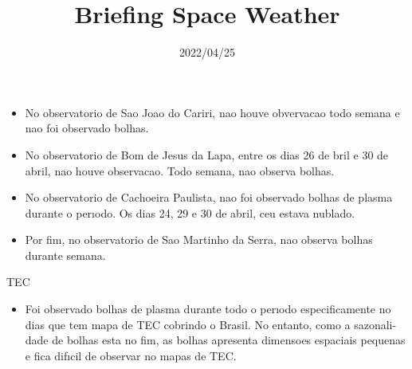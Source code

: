 \documentclass[11pt, oneside]{article}
\title{Briefing Space Weather}
\date{2022/04/25}
\begin{document}
\maketitle 

 \begin{itemize} 
 \item  No observatorio de Sao Joao do Cariri, nao houve obvervacao todo semana e nao foi observado bolhas. 
\item  No observatorio de Bom de Jesus da Lapa, entre os dias 26 de bril e 30 de abril, nao houve observacao. Todo semana, nao observa bolhas. 
\item  No observatorio de Cachoeira Paulista, nao foi observado bolhas de plasma durante o perıodo. Os dias 24, 29 e 30 de abril, ceu estava nublado. 
\item  Por fim, no observatorio de Sao Martinho da Serra, nao observa bolhas durante semana. 
\end{itemize} 
 TEC 
\begin{itemize} 
 \item  Foi observado bolhas de plasma durante todo o perıodo especificamente no dias que tem mapa de TEC cobrindo o Brasil. No entanto, como a sazonali- dade de bolhas esta no fim, as bolhas apresenta dimensoes espaciais pequenas e fica difıcil de observar no mapas de TEC. 
\end{itemize} 
 
\end{document}

